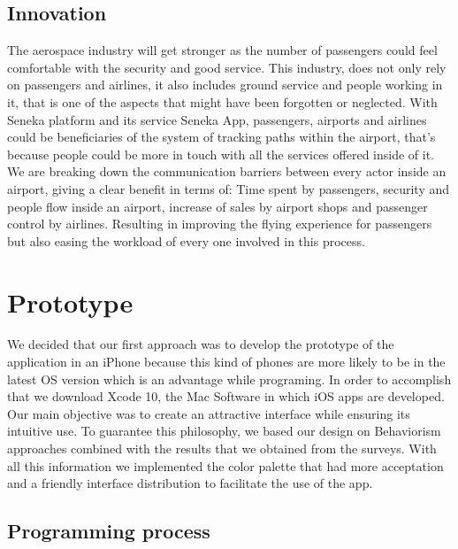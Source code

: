 \documentclass[12pt]{article}
\begin{document}
\subsection{Innovation}

The aerospace industry will get stronger as the number of passengers could feel comfortable with the security and good service. This industry, does not only rely on passengers and airlines, it also includes ground service and people working in it, that is one of the aspects that might have been forgotten or neglected. With Seneka platform and its service Seneka App, passengers, airports and airlines could be beneficiaries of the system of tracking paths within the airport, that's because people could be more in touch with all the services offered inside of it.\\

We are breaking down the communication barriers between every actor inside an airport, giving a clear benefit in terms of: Time spent by passengers, security and people flow inside an airport, increase of sales by airport shops and passenger control by airlines. Resulting in improving the flying experience for passengers but also easing the workload of every one involved in this process. 

\section{Prototype}

We decided that our first approach was to develop the prototype of the application in an iPhone because this kind of phones are more likely to be in the latest OS version which is an advantage while programing. In order to accomplish that we download Xcode 10, the Mac Software in which iOS apps are developed. Our main objective was to create an attractive interface while ensuring its intuitive use. To guarantee this philosophy, we based our design on Behaviorism approaches combined with the results that we obtained from the surveys. With all this information we implemented the color palette that had more acceptation and a friendly interface distribution to facilitate the use of the app. \\

\subsection{Programming process}
\end{document}
